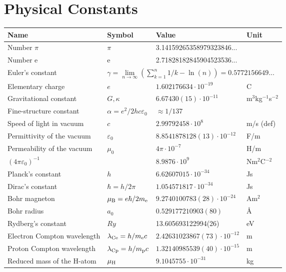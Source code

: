 \documentclass[twoside]{report}
\begin{document}
\chapter*{\center Physical Constants}
\begin{center}
\begin{tabular}{||l|lll||}
\hline
{\bf Name}&{\bf Symbol}&{\bf Value}&{\bf Unit}\\
\hline
\hline
Number $\pi$                 &$\pi$&3.14159265358979323846...&\\
Number e                     &e    &2.71828182845904523536...&\\
Euler's constant &\multicolumn{3}{|l||}{$\gamma=\lim\limits_{n\rightarrow\infty}\left(\sum\limits_{k=1}^n 1/k-\ln(n)\right)=0.5772156649...$}\\
\hline
Elementary charge            &$e$&$1.602176634\cdot10^{-19}$&C\rule{0pt}{13pt}\\
Gravitational constant       &$G,\kappa$&$6.67430(15)\cdot10^{-11}$&m$^3$kg$^{-1}$s$^{-2}$\\
Fine-structure constant      &$\alpha=e^2/2hc\varepsilon_0$&$\approx1/137$&\\
Speed of light in vacuum     &$c$&$2.99792458\cdot10^8$&m/s (def)\\
Permittivity of the vacuum   &$\varepsilon_0$&$8.8541878128(13)\cdot10^{-12}$&F/m\\
Permeability of the vacuum   &$\mu_0$&$4\pi\cdot10^{-7}$&H/m\\
$(4\pi\varepsilon_0)^{-1}$   &&$8.9876\cdot10^9$&Nm$^2$C$^{-2}$\\
\hline
Planck's constant            &$h$&$6.62607015\cdot10^{-34}$&Js\rule{0pt}{13pt}\\
Dirac's constant             &$\hbar=h/2\pi$&$1.054571817\cdot10^{-34}$&Js\\
Bohr magneton                &$\mu_{\rm B}=e\hbar/2m_{\rm e}$&$9.2740100783(28)\cdot10^{-24}$&Am$^2$\\
Bohr radius                  &$a_0$&$0.529177210903(80)$&\AA\\
Rydberg's constant           &$Ry$&13.605693122994(26)&eV\\
Electron Compton wavelength  &$\lambda_{\rm Ce}=h/m_{\rm e} c$&$2.42631023867(73)\cdot10^{-12}$&m\\
Proton Compton wavelength    &$\lambda_{\rm Cp}=h/m_{\rm p}c$&$1.32140985539(40)\cdot10^{-15}$&m\\
Reduced mass of the H-atom   &$\mu_{\rm H}$&$9.1045755\cdot10^{-31}$&kg\\

\end{tabular}
\end{center}
\end{document}

